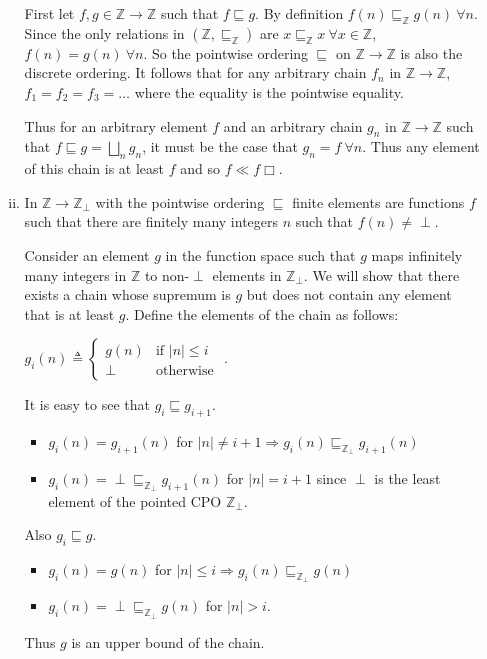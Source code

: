 \begin{enumerate}[(a)]
\begin{enumerate}[i.]
  First let $f,g \in \mathbb Z \rightarrow \mathbb Z$ such that $f \sqsubseteq g$. By definition $f(n) \sqsubseteq_{\mathbb Z} g(n) ~ \forall n$. Since the only relations in $(\mathbb Z, \sqsubseteq_{\mathbb Z})$ are $x \sqsubseteq_{\mathbb Z} x ~ \forall x \in \mathbb Z$, $f(n) = g(n) ~ \forall n$. So the pointwise ordering $\sqsubseteq$ on $\mathbb Z \rightarrow \mathbb Z$ is also the discrete ordering. It follows that for any arbitrary chain $f_n$ in $\mathbb Z \rightarrow \mathbb Z$, $f_1 = f_2 = f_3 =\ldots$ where the equality is the pointwise equality.

  Thus for an arbitrary element $f$ and an arbitrary chain $g_n$ in $\mathbb Z \rightarrow \mathbb Z$ such that $f \sqsubseteq g = \bigsqcup\limits_{n} g_n$, it must be the case that $g_n = f~\forall n$. Thus any element of this chain is at least $f$ and so $f \ll f \Box$.
  \item In $\mathbb Z \rightarrow \mathbb Z_{\perp}$ with the pointwise ordering $\sqsubseteq$ finite elements are functions $f$ such that there are finitely many integers $n$ such that $f(n)\neq \perp$.

  Consider an element $g$ in the function space such that $g$ maps infinitely many integers in $\mathbb Z$ to non-$\perp$ elements in $\mathbb Z_{\perp}$. We will show that there exists a chain whose supremum is $g$ but does not contain any element that is at least $g$. Define the elements of the chain as follows:

  $g_i(n)\triangleq 
  \begin{cases} 
  g(n) &\mbox{if } |n| \leq i \\ 
  \perp & \mbox{otherwise } 
  \end{cases}.$

  It is easy to see that $g_i \sqsubseteq g_{i+1}$.
  \begin{itemize}
  \item $g_i(n) = g_{i+1}(n)$ for $|n| \neq i+1 \Rightarrow g_i(n) \sqsubseteq_{\mathbb Z_ \perp} g_{i+1}(n)$
  \item $g_i(n) = \perp \sqsubseteq_{\mathbb Z_ \perp} g_{i+1}(n)$ for $|n| = i+1$ since $\perp$ is the least element of the pointed CPO $\mathbb Z_{\perp}$.
  \end{itemize}

  Also $g_i \sqsubseteq g$.
  \begin{itemize}
  \item $g_i(n) = g(n)$ for $|n| \leq i \Rightarrow g_i(n) \sqsubseteq_{\mathbb Z_ \perp} g(n)$
  \item $g_i(n) = \perp \sqsubseteq_{\mathbb Z_ \perp} g(n)$ for $|n| > i$.
  \end{itemize}
  Thus $g$ is an upper bound of the chain. 


\end{enumerate}
\end{enumerate}
